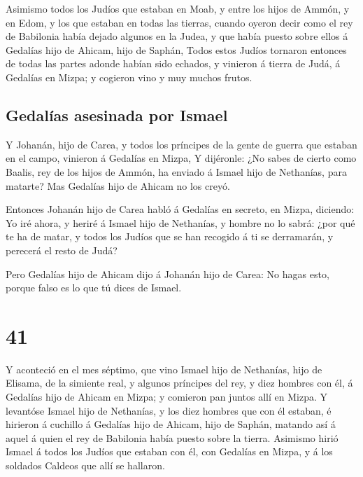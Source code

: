  Asimismo todos los Judíos que estaban en Moab, y entre los
hijos de Ammón, y en Edom, y los que estaban en todas las tierras,
cuando oyeron decir como el rey de Babilonia había dejado algunos en la
Judea, y que había puesto sobre ellos á Gedalías hijo de Ahicam, hijo de
Saphán,  Todos estos Judíos tornaron entonces de todas las
partes adonde habían sido echados, y vinieron á tierra de Judá, á
Gedalías en Mizpa; y cogieron vino y muy muchos frutos.

\hypertarget{gedaluxedas-asesinada-por-ismael}{%
\subsection{Gedalías asesinada por
Ismael}\label{gedaluxedas-asesinada-por-ismael}}

 Y Johanán, hijo de Carea, y todos los príncipes de la
gente de guerra que estaban en el campo, vinieron á Gedalías en Mizpa,
 Y dijéronle: ¿No sabes de cierto como Baalis, rey de los
hijos de Ammón, ha enviado á Ismael hijo de Nethanías, para matarte? Mas
Gedalías hijo de Ahicam no los creyó.

 Entonces Johanán hijo de Carea habló á Gedalías en
secreto, en Mizpa, diciendo: Yo iré ahora, y heriré á Ismael hijo de
Nethanías, y hombre no lo sabrá: ¿por qué te ha de matar, y todos los
Judíos que se han recogido á ti se derramarán, y perecerá el resto de
Judá?

 Pero Gedalías hijo de Ahicam dijo á Johanán hijo de Carea:
No hagas esto, porque falso es lo que tú dices de Ismael.

\hypertarget{section-40}{%
\section{41}\label{section-40}}

 Y aconteció en el mes séptimo, que vino Ismael hijo de
Nethanías, hijo de Elisama, de la simiente real, y algunos príncipes del
rey, y diez hombres con él, á Gedalías hijo de Ahicam en Mizpa; y
comieron pan juntos allí en Mizpa.  Y levantóse Ismael hijo
de Nethanías, y los diez hombres que con él estaban, é hirieron á
cuchillo á Gedalías hijo de Ahicam, hijo de Saphán, matando así á aquel
á quien el rey de Babilonia había puesto sobre la tierra. 
Asimismo hirió Ismael á todos los Judíos que estaban con él, con
Gedalías en Mizpa, y á los soldados Caldeos que allí se hallaron.


